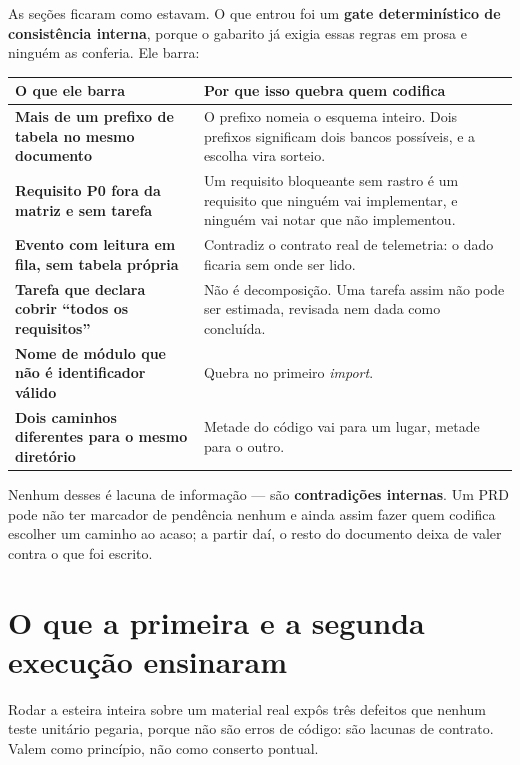 \documentclass[11pt,a4paper]{article}
\begin{document}
As seções ficaram como estavam. O que entrou foi um \textbf{gate determinístico de consistência interna}, porque o gabarito já exigia essas regras em prosa e ninguém as conferia. Ele barra:

\begin{center}
\begin{tabularx}{\textwidth}{>{\sffamily\bfseries\footnotesize\color{unNavy}}p{5.4cm}X}
\toprule
\sffamily\bfseries\footnotesize\color{unNavy}O que ele barra & \sffamily\bfseries\footnotesize\color{unNavy}Por que isso quebra quem codifica \\
\midrule
Mais de um prefixo de tabela no mesmo documento & O prefixo nomeia o esquema inteiro. Dois prefixos significam dois bancos possíveis, e a escolha vira sorteio. \\
Requisito P0 fora da matriz e sem tarefa & Um requisito bloqueante sem rastro é um requisito que ninguém vai implementar, e ninguém vai notar que não implementou. \\
Evento com leitura em fila, sem tabela própria & Contradiz o contrato real de telemetria: o dado ficaria sem onde ser lido. \\
Tarefa que declara cobrir ``todos os requisitos'' & Não é decomposição. Uma tarefa assim não pode ser estimada, revisada nem dada como concluída. \\
Nome de módulo que não é identificador válido & Quebra no primeiro \emph{import}. \\
Dois caminhos diferentes para o mesmo diretório & Metade do código vai para um lugar, metade para o outro. \\
\bottomrule
\end{tabularx}
\end{center}

Nenhum desses é lacuna de informação --- são \textbf{contradições internas}. Um PRD pode não ter marcador de pendência nenhum e ainda assim fazer quem codifica escolher um caminho ao acaso; a partir daí, o resto do documento deixa de valer contra o que foi escrito.

\section{O que a primeira e a segunda execução ensinaram}
\label{sec:execucoes}

Rodar a esteira inteira sobre um material real expôs três defeitos que nenhum teste unitário pegaria, porque não são erros de código: são lacunas de contrato. Valem como princípio, não como conserto pontual.
\end{document}
